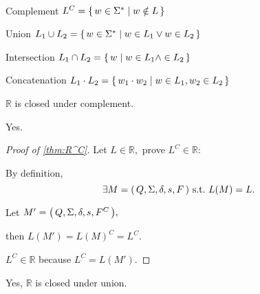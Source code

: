 \begin{definition} \ \\
    \begin{compactdesc}
    \item[Complement]
        $L^C = { \left\{\,w \in \Sigma^* \mid w \notin L\,\right\} }$
    \item[Union]
        $L_1 \cup L_2 = { \left\{\,w \in \Sigma^* \mid w \in L_1 \vee w \in L_2\,\right\} }$
    \item[Intersection]
        $L_1 \cap L_2 = { \left\{\,w \mid w \in L_1 \wedge \in L_2\,\right\} }$
    \item[Concatenation]
        $L_1 \cdot L_2 = { \left\{\,w_1 \cdot w_2 \mid w \in L_1, w_2 \in L_2\,\right\} }$
    \end{compactdesc}
\end{definition}

\begin{theorem}
    \label{thm:R_closed_under_union}
    $\mathbb R$ is closed under complement.
\end{theorem}

\begin{example}
    Yes.

    \begin{proof}[Proof of \autoref{thm:R^C}]
        Let $L \in \mathbb R,$
        prove $L^C \in \mathbb R:$

        By definition, 
        \[
            \exists \DFA \text{ s.t.\ } L(M) = L.
        \]

        Let $M' = { \left(\,Q,\Sigma,\delta,s,F^C\,\right) },$

        then $L(M') = L(M)^C = L^C.$

        $L^C \in \mathbb R$ because $L^C = L(M').$
    \end{proof}
\end{example}

\begin{example}
    \label{exa:R_closed_under_union}
        Yes, $\mathbb R$ is closed under union.
\end{example}

